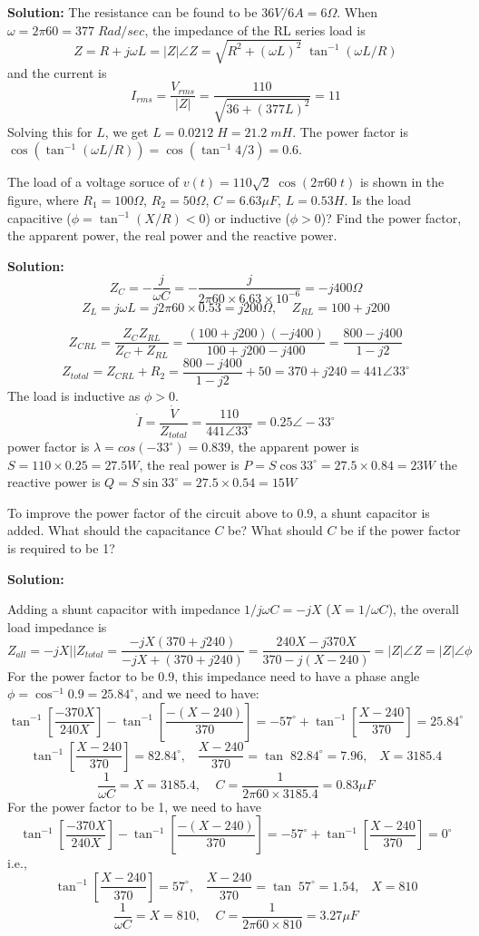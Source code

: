 {\bf Solution:} The resistance can be found to be $36V/6A=6\Omega$.
When $\omega=2\pi 60=377\;Rad/sec$, the impedance of the RL series load 
is 
\[ Z=R+j\omega L=|Z|\angle Z=\sqrt{R^2+( \omega L)^2}\;\tan^{-1} (\omega L/R) \]
and the current is
\[ I_{rms}=\frac{V_{rms}}{|Z|}=\frac{110}{\sqrt{36+(377 L)^2}}=11 \]
Solving this for $L$, we get $L=0.0212\;H=21.2\;mH$. The power factor is
$\cos (\tan^{-1} (\omega L/R))=\cos (\tan^{-1} 4/3)=0.6$.

\item The load of a voltage soruce of $v(t)=110\sqrt{2} \;\cos(2\pi 60\;t)$
is shown in the figure, where $R_1=100\Omega$, $R_2=50\Omega$, $C=6.63\mu F$, 
$L=0.53 H$. Is the load capacitive ($\phi=\tan^{-1}(X/R)<0$) or inductive 
($\phi>0$)? Find the power factor, the apparent power, the real power and 
the reactive power. 


 {\bf Solution:}
 \[ Z_C=-\frac{j}{\omega C}=-\frac{j}{2\pi 60\times 6.63\times 10^{-6}}
 	=-j400\Omega\]
 \[Z_L=j\omega L=j 2\pi 60\times 0.53=j200\Omega,\;\;\;\; Z_{RL}=100+j200\]
 
 \[ Z_{CRL}=\frac{Z_C Z_{RL}}{Z_C+Z_{RL}}=\frac{(100+j200)(-j400)}{100+j200-j400}
 	=\frac{800-j400}{1-j2}	\]
 \[
 Z_{total}=Z_{CRL}+R_2=\frac{800-j400}{1-j2}+50=370+j240=441\angle 33^\circ
 \]
 The load is inductive as $\phi>0$.
 \[ \dot{I}=\frac{\dot{V}}{Z_{total}}=\frac{110}{441\angle 33^\circ}
 	=0.25\angle -33^\circ	\]
 power factor is $\lambda=cos (-33^\circ)=0.839$, 
 the apparent power is $S=110\times 0.25=27.5 W$, 
 the real power is $P=S \cos 33^\circ=27.5\times 0.84=23 W$
 the reactive power is $Q=S \sin 33^\circ=27.5\times 0.54=15 W$

\item To improve the power factor of the circuit above to 0.9, a shunt 
capacitor is added. What should the capacitance $C$ be? What should $C$ be 
if the power factor is required to be 1?


 {\bf Solution:}
 
 Adding a shunt capacitor with impedance $1/j\omega C=-jX$ ($X=1/\omega C$), 
 the overall load impedance is
 \[	Z_{all}=-jX || Z_{total}=\frac{-jX(370+j240)}{-jX+(370+j240)}
 	=\frac{240X-j370X}{370-j(X-240)}=|Z|\angle Z=|Z|\angle \phi	\]
 For the power factor to be 0.9, this impedance need to have a phase angle 
 $\phi=\cos^{-1} 0.9=25.84^\circ$, and we need to have:
 \[	\tan^{-1}[\frac{-370X}{240X}]-\tan^{-1}[\frac{-(X-240)}{370}]=
 	-57^\circ+\tan^{-1}[\frac{X-240}{370}]=25.84^\circ \]
 \[	\tan^{-1}[\frac{X-240}{370}]=82.84^\circ, \;\;\;
 \frac{X-240}{370}=\tan \;82.84^\circ=7.96, \;\;\; X=3185.4 \]
 \[ \frac{1}{\omega C}=X=3185.4,\;\;\;\;C=\frac{1}{2\pi 60\times 3185.4}
 =0.83 \mu F \]
 For the power factor to be 1, we need to have
 \[	\tan^{-1}[\frac{-370X}{240X}]-\tan^{-1}[\frac{-(X-240)}{370}]=
 	-57^\circ+\tan^{-1}[\frac{X-240}{370}]=0^\circ \]
 i.e., 
 \[	\tan^{-1}[\frac{X-240}{370}]=57^\circ, \;\;\;
 \frac{X-240}{370}=\tan \;57^\circ=1.54, \;\;\; X=810 \]
 \[ \frac{1}{\omega C}=X=810,\;\;\;\;C=\frac{1}{2\pi 60\times 810}
 =3.27 \mu F \]


